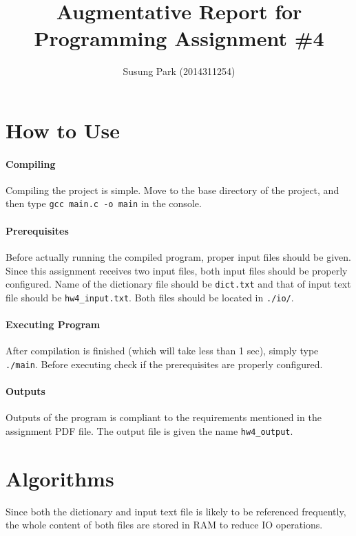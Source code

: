 \documentclass[11pt]{article}
\title{Augmentative Report for \\Programming Assignment \#4}
\author{Susung Park (2014311254)}
\affil{Data Structures, Class \#41}
\begin{document}
	\maketitle
	
	\newpage
	\section{How to Use}
	\paragraph{Compiling}
	Compiling the project is simple. Move to the base directory of the project, and then type \texttt{gcc main.c -o main} in the console.
	
	\paragraph{Prerequisites}
	Before actually running the compiled program, proper input files should be given. Since this assignment receives two input files, both input files should be properly configured. Name of the dictionary file should be \texttt{dict.txt} and that of input text file should be \texttt{hw4\_input.txt}. Both files should be located in \texttt{./io/}.
	
	\paragraph{Executing Program}
	After compilation is finished (which will take less than 1 sec), simply type \texttt{./main}. Before executing check if the prerequisites are properly configured.
	
	\paragraph{Outputs}
	Outputs of the program is compliant to the requirements mentioned in the assignment PDF file. The output file is given the name \texttt{hw4\_output}.
	\\
	
	\section{Algorithms}
	Since both the dictionary and input text file is likely to be referenced frequently, the whole content of both files are stored in RAM to reduce IO operations.
	
\end{document}
